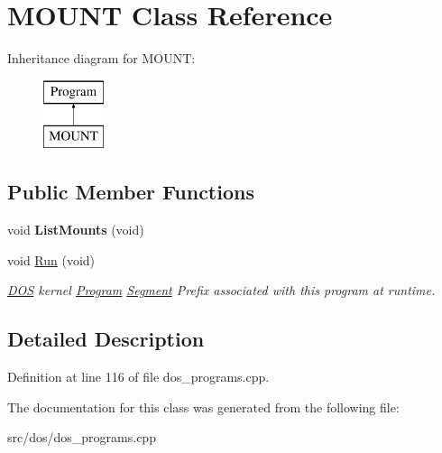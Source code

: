 \hypertarget{classMOUNT}{\section{M\-O\-U\-N\-T Class Reference}
\label{classMOUNT}
}
Inheritance diagram for M\-O\-U\-N\-T\-:\begin{figure}[H]
\begin{center}
\leavevmode
\includegraphics[height=2.000000cm]{classMOUNT}
\end{center}
\end{figure}
\subsection*{Public Member Functions}
\begin{DoxyCompactItemize}
\item 
\hypertarget{classMOUNT_a162c6c15860f047f90e4a632cd80f769}{void {\bfseries List\-Mounts} (void)}\label{classMOUNT_a162c6c15860f047f90e4a632cd80f769}

\item 
\hypertarget{classMOUNT_aecbba89c92ac2fbd78a929ed04818d58}{void \hyperlink{classMOUNT_aecbba89c92ac2fbd78a929ed04818d58}{Run} (void)}\label{classMOUNT_aecbba89c92ac2fbd78a929ed04818d58}

\begin{DoxyCompactList}\small\item\em \hyperlink{classDOS}{D\-O\-S} kernel \hyperlink{classProgram}{Program} \hyperlink{structSegment}{Segment} Prefix associated with this program at runtime. \end{DoxyCompactList}\end{DoxyCompactItemize}


\subsection{Detailed Description}


Definition at line 116 of file dos\-\_\-programs.\-cpp.



The documentation for this class was generated from the following file\-:\begin{DoxyCompactItemize}
\item 
src/dos/dos\-\_\-programs.\-cpp\end{DoxyCompactItemize}
